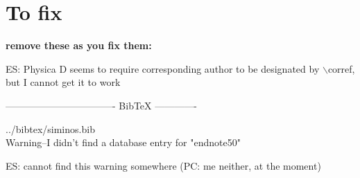 
\section*{To fix}

{\bf remove these as you fix them:}

ES: Physica D seems to require corresponding author to be designated by $\backslash$corref, but I cannot get it to work

---------------------------------- BibTeX -------------

../bibtex/siminos.bib
\\
Warning--I didn't find a database entry for "endnote50"

ES: cannot find this warning somewhere 
(PC: me neither, at the moment)